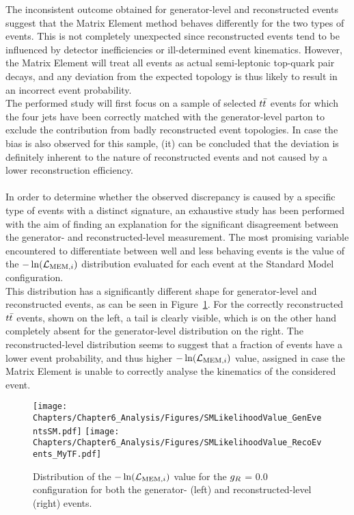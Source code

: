 The inconsistent outcome obtained for generator-level and reconstructed events suggest that the Matrix Element method behaves differently for the two types of events.
This is not completely unexpected since reconstructed events tend to be influenced by detector inefficiencies or ill-determined event kinematics.
However, the Matrix Element will treat all events as actual semi-leptonic top-quark pair decays, and any deviation from the expected topology is thus likely to result in an incorrect event probability.
\\
The performed study will first focus on a sample of selected $t\bar{t}$ events for which the four jets have been correctly matched with the generator-level parton to exclude the contribution from badly reconstructed event topologies.
In case the bias is also observed for this sample, (it) can be concluded that the deviation is definitely inherent to the nature of reconstructed events and not caused by a lower reconstruction efficiency.
\\
\\
In order to determine whether the observed discrepancy is caused by a specific type of events with a distinct signature, an exhaustive study has been performed with the aim of finding an explanation for the significant disagreement between the generator- and reconstructed-level measurement.
The most promising variable encountered to differentiate between well and less behaving events is the value of the $-\ln(\mathcal{L}_{\textrm{MEM}, i})$ distribution evaluated for each event at the Standard Model configuration.
\\
This distribution has a significantly different shape for generator-level and reconstructed events, as can be seen in Figure~\ref{fig::SMLik}.
For the correctly reconstructed $t\bar{t}$ events, shown on the left, a tail is clearly visible, which is on the other hand completely absent for the generator-level distribution on the right.
The reconstructed-level distribution seems to suggest that a fraction of events have a lower event probability, and thus higher $-\ln(\mathcal{L}_{\textrm{MEM}, i})$ value, assigned in case the Matrix Element is unable to correctly analyse the kinematics of the considered event.
\\
\begin{figure}[h!t]
 \centering
 \texttt{[image: Chapters/Chapter6\_Analysis/Figures/SMLikelihoodValue\_GenEventsSM.pdf]} \hspace{0.3cm}
 \texttt{[image: Chapters/Chapter6\_Analysis/Figures/SMLikelihoodValue\_RecoEvents\_MyTF.pdf]}
 \caption{Distribution of the $-\ln(\mathcal{L}_{\textrm{MEM}, i})$ value for the $g_{R}$ = $0.0$ configuration for both the generator- (left) and reconstructed-level (right) events.} \label{fig::SMLik}
\end{figure}

